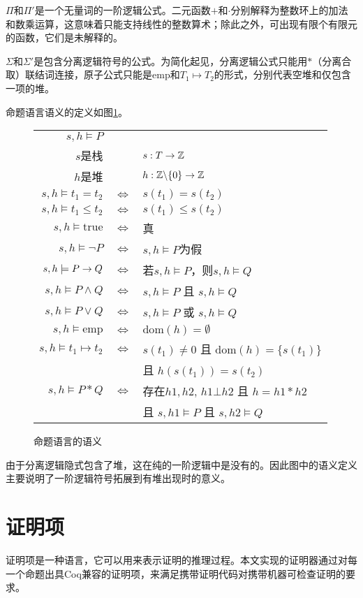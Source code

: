 $\Pi$和$\Pi'$是一个无量词的一阶逻辑公式。二元函数$+$和$\cdot$分别解释为整数环上的加法和数乘运算，这意味着只能支持线性的整数算术；除此之外，可出现有限个有限元的函数，它们是未解释的。

$\Sigma$和$\Sigma'$是包含分离逻辑符号的公式。为简化起见，分离逻辑公式只能用$\ast$（分离合取）联结词连接，原子公式只能是$\mathrm{emp}$和$T_1 \mapsto T_2$的形式，分别代表空堆和仅包含一项的堆。

命题语言语义的定义如图\ref{struct:semantic}。
\begin{figure}[!htbp]
  \centering
  \begin{tabular}{rcl}
    $s, h \models P$ & & \\
    $s$是栈 & & $s: T \rightarrow \mathbb{Z}$ \\
    $h$是堆 & & $h: \mathbb{Z} 	\backslash \{0\} \rightarrow \mathbb{Z}$ \\
    $s, h \models t_1 = t_2$ & $\iff$ & $s(t_1) = s(t_2)$ \\
    $s, h \models t_1 \leq t_2$ & $\iff$ & $s(t_1) \leq s(t_2)$ \\
    $s, h \models \mathrm{true}$ & $\iff$ & 真 \\
    $s, h \models \lnot P$ & $\iff$ & $s, h \models P$为假 \\
    $s, h \models P \rightarrow Q$ & $\iff$ & 若$s, h \models P$，则$s, h \models Q$ \\
    $s, h \models P \land Q$ & $\iff$ & $s, h \models P$ 且 $s, h \models Q$ \\
    $s, h \models P \lor Q$ & $\iff$ & $s, h \models P$ 或 $s, h \models Q$ \\
    $s, h \models \mathrm{emp}$ & $\iff$ & $\mathrm{dom}(h)= \emptyset$ \\
    $s, h \models t_1 \mapsto t_2$ & $\iff$ & $s(t_1) \neq 0$ 且 $\mathrm{dom}(h) = \{s(t_1)\}$ \\
    & & 且 $h(s(t_1)) = s(t_2)$ \\
    $s, h \models P \ast Q$ & $\iff$ & 存在$h1, h2$, $h1 \bot h2$ 且 $h = h1 \ast h2$ \\
    & & 且 $s, h1 \models P$ 且 $s, h2 \models Q$ \\
  \end{tabular}
  \caption{命题语言的语义}
  \label{struct:semantic}
\end{figure}

由于分离逻辑隐式包含了堆，这在纯的一阶逻辑中是没有的。因此图中的语义定义主要说明了一阶逻辑符号拓展到有堆出现时的意义。

\section{证明项}
证明项是一种语言，它可以用来表示证明的推理过程。本文实现的证明器通过对每一个命题出具Coq兼容的证明项，来满足携带证明代码对携带机器可检查证明的要求。

